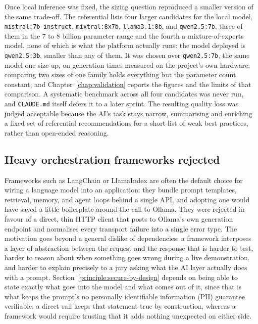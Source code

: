 Once local inference was fixed, the sizing question reproduced a smaller
version of the same trade-off. The referential lists four larger
candidates for the local model, \texttt{mistral:7b-\allowbreak instruct},
\texttt{mixtral:8x7b}, \texttt{llama3.1:\allowbreak 8b}, and
\texttt{qwen2.5:\allowbreak 7b}, three of them in the 7 to 8 billion
parameter range and the fourth a mixture-of-experts model, none of which is
what the platform actually runs: the model deployed is
\texttt{qwen2.5:\allowbreak 3b}, smaller than any of them.
It was chosen over \texttt{qwen2.5:\allowbreak 7b}, the same model one size up,
on generation times measured on the project's own hardware; comparing two sizes
of one family holds everything but the parameter count constant, and
Chapter~\ref{chap:validation} reports the figures and the limits of that
comparison. A systematic benchmark across all four candidates was never run, and
\texttt{CLAUDE.md} itself defers it to a later sprint. The resulting quality loss was judged
acceptable because the AI's task stays narrow, summarising and enriching a
fixed set of referential recommendations for a short list of weak best
practices, rather than
open-ended reasoning.

\subsection{Heavy orchestration frameworks rejected}

Frameworks such as LangChain or LlamaIndex are often the default choice
for wiring a language model into an application: they bundle prompt
templates, retrieval, memory, and agent loops behind a single API, and
adopting one would have saved a little boilerplate around the call to
Ollama. They were rejected in favour of a direct, thin HTTP client that
posts to Ollama's own generation endpoint and normalises every transport
failure into a single error type. The motivation goes beyond a general
dislike of dependencies: a framework interposes a layer of abstraction
between the request and the response that is harder to test, harder to
reason about when something goes wrong during a live demonstration, and
harder to explain precisely to a jury asking what the AI layer actually
does with a prompt. Section~\ref{principle:secure-by-design} depends on
being able to state exactly what goes into the model and what comes out of
it, since that is what keeps the prompt's no personally identifiable information (PII) guarantee verifiable;
a direct call keeps that statement true by construction, whereas a
framework would require trusting that it adds nothing unexpected on either
side.

